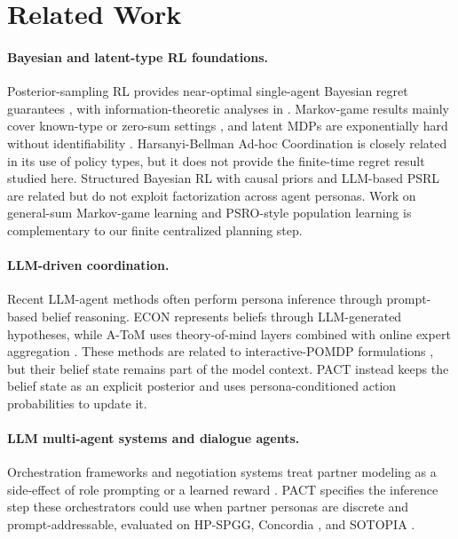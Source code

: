 \documentclass[letterpaper]{article} %
\begin{document}
\section{Related Work}
\label{sec:related}

\paragraph{Bayesian and latent-type RL foundations.} Posterior-sampling RL provides near-optimal single-agent Bayesian regret guarantees \citep{strens2000bayesian,osband2013more,agrawal2017optimistic,ouyang2017learning}, with information-theoretic analyses in \citet{russo2014learning,russo2016information,dasgupta2025bayesian}. Markov-game results mainly cover known-type or zero-sum settings \citep{jahromi2024bayesian,xiong2022self}, and latent MDPs are exponentially hard without identifiability \citep{kwon2021rl,nguyen2024learning}. Harsanyi-Bellman Ad-hoc Coordination \citep{albrecht2015game,albrecht2019convergence} is closely related in its use of policy types, but it does not provide the finite-time regret result studied here. Structured Bayesian RL with causal priors \citep{mutti2024exploiting} and LLM-based PSRL \citep{arumugam2025toward} are related but do not exploit factorization across agent personas. Work on general-sum Markov-game learning \citep{jin2024v,song2021can,mao2023provably,erez2023regret,yang2025incentivize} and PSRO-style population learning \citep{lanctot2017unified,muller2019generalized,marris2021multi} is complementary to our finite centralized planning step.

\paragraph{LLM-driven coordination.} Recent LLM-agent methods often perform persona inference through prompt-based belief reasoning. ECON \citep{yi2025debate} represents beliefs through LLM-generated hypotheses, while A-ToM \citep{mu2026adaptive} uses theory-of-mind layers combined with online expert aggregation \citep{cesa1997use}. These methods are related to interactive-POMDP formulations \citep{gmytrasiewicz2005framework}, but their belief state remains part of the model context. PACT instead keeps the belief state as an explicit posterior and uses persona-conditioned action probabilities to update it.

\paragraph{LLM multi-agent systems and dialogue agents.} Orchestration frameworks \citep{wu2023autogen,li2023camel,hong2024metagpt,park2023generative,chen2023autoagents} and negotiation systems \citep{meta2022human,abdulhai2023lmrl} treat partner modeling as a side-effect of role prompting or a learned reward \citep{agashe2025llm}. PACT specifies the inference step these orchestrators could use when partner personas are discrete and prompt-addressable, evaluated on HP-SPGG, Concordia \citep{vezhnevets2023generative,smith2026evaluating}, and SOTOPIA \citep{zhou2024sotopia}.
\end{document}
